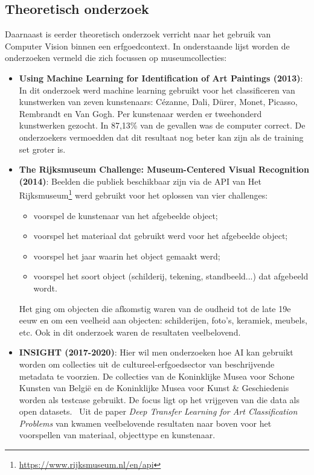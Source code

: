 \subsection{Theoretisch onderzoek}
Daarnaast is eerder theoretisch onderzoek verricht naar het gebruik van Computer Vision binnen een erfgoedcontext. In onderstaande lijst worden de onderzoeken vermeld die zich focussen op museumcollecties:
\begin{itemize}
	\item \textbf{Using Machine Learning for Identification of Art Paintings (2013)}: In dit onderzoek werd machine learning gebruikt voor het classificeren van kunstwerken van zeven kunstenaars: C\'{e}zanne, Dali, D\"{u}rer, Monet, Picasso, Rembrandt en Van Gogh. Per kunstenaar werden er tweehonderd kunstwerken gezocht. In 87,13\% van de gevallen was de computer correct. De onderzoekers vermoedden dat dit resultaat nog beter kan zijn als de training set groter is.~\autocite{Blessings2013}

	\item \textbf{The Rijksmuseum Challenge: Museum-Centered Visual Recognition (2014)}: Beelden die publiek beschikbaar zijn via de API van Het Rijksmuseum\footnote{\url{https://www.rijksmuseum.nl/en/api}} werd gebruikt voor het oplossen van vier challenges:
	\begin{itemize}
		\item voorspel de kunstenaar van het afgebeelde object;
		\item voorspel het materiaal dat gebruikt werd voor het afgebeelde object;
		\item voorspel het jaar waarin het object gemaakt werd;
		\item voorspel het soort object (schilderij, tekening, standbeeld...) dat afgebeeld wordt.
	\end{itemize}
	Het ging om objecten die afkomstig waren van de oudheid tot de late 19e eeuw en om een veelheid aan objecten: schilderijen, foto's, keramiek, meubels, etc. Ook in dit onderzoek waren de resultaten veelbelovend.~\autocite{Mensink2014}

	\item \textbf{INSIGHT (2017-2020)}: Hier wil men onderzoeken hoe AI kan gebruikt worden om collecties uit de cultureel-erfgoedsector van beschrijvende metadata te voorzien. De collecties van de Koninklijke Musea voor Schone Kunsten van Belgi\"{e} en de Koninklijke Musea voor Kunst \& Geschiedenis worden als testcase gebruikt. De focus ligt op het vrijgeven van die data als open datasets.~\autocite{UniAntwerpen2017?} Uit de paper \emph{Deep Transfer Learning for Art Classification Problems} van \textcite{Sabatteli2018} kwamen veelbelovende resultaten naar boven voor het voorspellen van materiaal, objecttype en kunstenaar.


\end{itemize}
